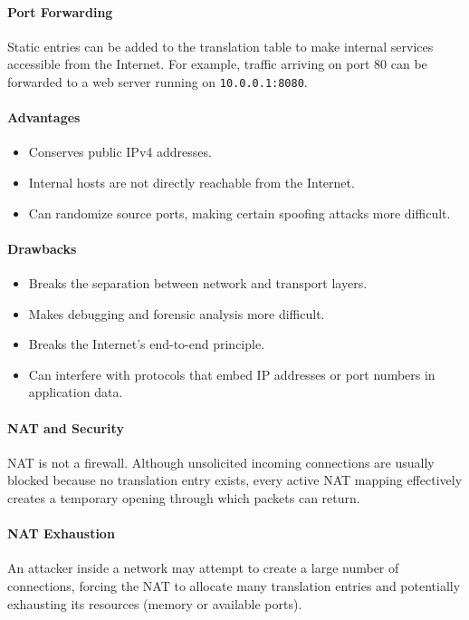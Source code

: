 \paragraph{Port Forwarding}
Static entries can be added to the translation table to make internal
services accessible from the Internet. For example, traffic arriving on
port 80 can be forwarded to a web server running on
\texttt{10.0.0.1:8080}.

\paragraph{Advantages}
\begin{itemize}
    \item Conserves public IPv4 addresses.
    \item Internal hosts are not directly reachable from the Internet.
    \item Can randomize source ports, making certain spoofing attacks
          more difficult.
\end{itemize}

\paragraph{Drawbacks}
\begin{itemize}
    \item Breaks the separation between network and transport layers.
    \item Makes debugging and forensic analysis more difficult.
    \item Breaks the Internet's end-to-end principle.
    \item Can interfere with protocols that embed IP addresses or port
          numbers in application data.
\end{itemize}

\paragraph{NAT and Security}
NAT is not a firewall. Although unsolicited incoming connections are
usually blocked because no translation entry exists, every active NAT
mapping effectively creates a temporary opening through which packets
can return.

\paragraph{NAT Exhaustion}
An attacker inside a network may attempt to create a large number of
connections, forcing the NAT to allocate many translation entries and
potentially exhausting its resources (memory or available ports).

